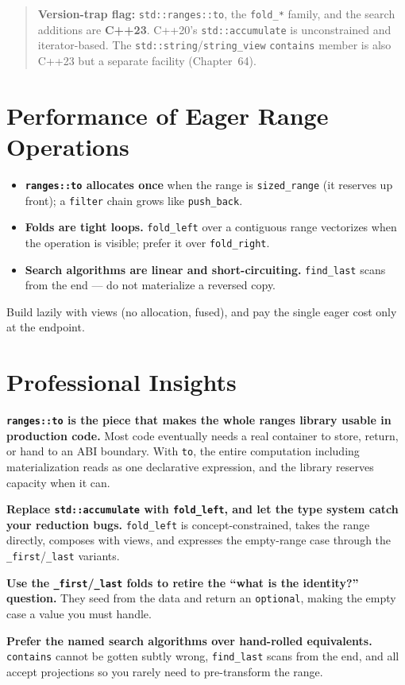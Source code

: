 \begin{quote}
\textbf{Version-trap flag:} \lstinline|std::ranges::to|, the \lstinline|fold_*| family, and the search additions are \textbf{C++23}. C++20's \lstinline|std::accumulate| is unconstrained and iterator-based. The \lstinline|std::string|/\lstinline|string_view| \lstinline|contains| member is also C++23 but a separate facility (Chapter~64).
\end{quote}

\section{Performance of Eager Range Operations}

\begin{itemize}
    \item \textbf{\lstinline|ranges::to| allocates once} when the range is \lstinline|sized_range| (it reserves up front); a \lstinline|filter| chain grows like \lstinline|push_back|.
    \item \textbf{Folds are tight loops.} \lstinline|fold_left| over a contiguous range vectorizes when the operation is visible; prefer it over \lstinline|fold_right|.
    \item \textbf{Search algorithms are linear and short-circuiting.} \lstinline|find_last| scans from the end --- do not materialize a reversed copy.
\end{itemize}

Build lazily with views (no allocation, fused), and pay the single eager cost only at the endpoint.

\section{Professional Insights}

\textbf{\lstinline|ranges::to| is the piece that makes the whole ranges library usable in production code.} Most code eventually needs a real container to store, return, or hand to an ABI boundary. With \lstinline|to|, the entire computation including materialization reads as one declarative expression, and the library reserves capacity when it can.

\textbf{Replace \lstinline|std::accumulate| with \lstinline|fold_left|, and let the type system catch your reduction bugs.} \lstinline|fold_left| is concept-constrained, takes the range directly, composes with views, and expresses the empty-range case through the \lstinline|_first|/\lstinline|_last| variants.

\textbf{Use the \lstinline|_first|/\lstinline|_last| folds to retire the ``what is the identity?'' question.} They seed from the data and return an \lstinline|optional|, making the empty case a value you must handle.

\textbf{Prefer the named search algorithms over hand-rolled equivalents.} \lstinline|contains| cannot be gotten subtly wrong, \lstinline|find_last| scans from the end, and all accept projections so you rarely need to pre-transform the range.
